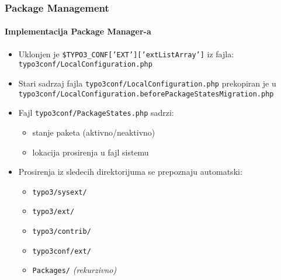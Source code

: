 
\begin{frame}[fragile]
	\frametitle{Package Management}
	\framesubtitle{Implementacija Package Manager-a}

	\begin{itemize}
		\item Uklonjen je \texttt{\$TYPO3\_CONF['EXT']['extListArray']} iz fajla: \newline
			\smaller\texttt{typo3conf/LocalConfiguration.php}\normalsize

		\item Stari sadrzaj fajla \small\texttt{typo3conf/LocalConfiguration.php} prekopiran je u \normalsize\newline
			\smaller\texttt{typo3conf/LocalConfiguration.beforePackageStatesMigration.php}\normalsize

		\item Fajl \texttt{typo3conf/PackageStates.php} sadrzi:

			\begin{itemize}
				\item stanje paketa (aktivno/neaktivno)
				\item lokacija prosirenja u fajl sistemu
			\end{itemize}

		\item Prosirenja iz sledecih direktorijuma se prepoznaju automatski:

			\begin{itemize}
				\item \texttt{typo3/sysext/}
				\item \texttt{typo3/ext/}
				\item \texttt{typo3/contrib/}
				\item \texttt{typo3conf/ext/}
				\item \texttt{Packages/} \emph{(rekurzivno)}
			\end{itemize}

	\end{itemize}

\end{frame}


